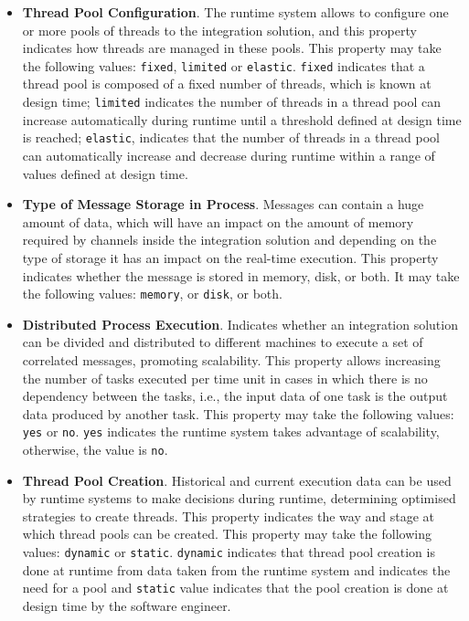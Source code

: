 \begin{itemize}
\item \textbf{Thread Pool Configuration}. The runtime system allows to configure one or more pools of threads to the integration solution, and this property indicates how threads are managed in these pools. This property may take the following values: \texttt{fixed}, \texttt{limited} or \texttt{elastic}. \texttt{fixed} indicates that a thread pool is composed of a fixed number of threads, which is known at design time; \texttt{limited} indicates the number of threads in a thread pool can increase automatically during runtime until a threshold defined at design time is reached; \texttt{elastic}, indicates that the number of threads in a thread pool can automatically increase and decrease during runtime within a range of values defined at design time.
%
\item \textbf{Type of Message Storage in Process}. Messages can contain a huge amount of data, which will have an impact on the amount of memory required by channels inside the integration solution and depending on the type of storage it has an impact on the real-time execution. This property indicates whether the message is stored in memory, disk, or both. It may take the following values: \texttt{memory}, or \texttt{disk}, or both.
%
\item \textbf{Distributed Process Execution}. Indicates whether an integration solution can be divided and distributed to different machines to execute a set of correlated messages, promoting scalability. This property allows increasing the number of tasks executed per time unit in cases in which there is no dependency between the tasks, i.e., the input data of one task is the output data produced by another task. This property may take the following values: \texttt{yes} or \texttt{no}. \texttt{yes} indicates the runtime system takes advantage of scalability, otherwise, the value is \texttt{no}.
%	
\item \textbf{Thread Pool Creation}. Historical and current execution data can be used by runtime systems to make decisions during runtime, determining optimised strategies to create threads. This property indicates the way and stage at which thread pools can be created. This property may take the following values: \texttt{dynamic} or \texttt{static}. \texttt{dynamic} indicates that thread pool creation is done at runtime from data taken from the runtime system and indicates the need for a pool and \texttt{static} value indicates that the pool creation is done at design time by the software engineer.	
\end{itemize}
%
